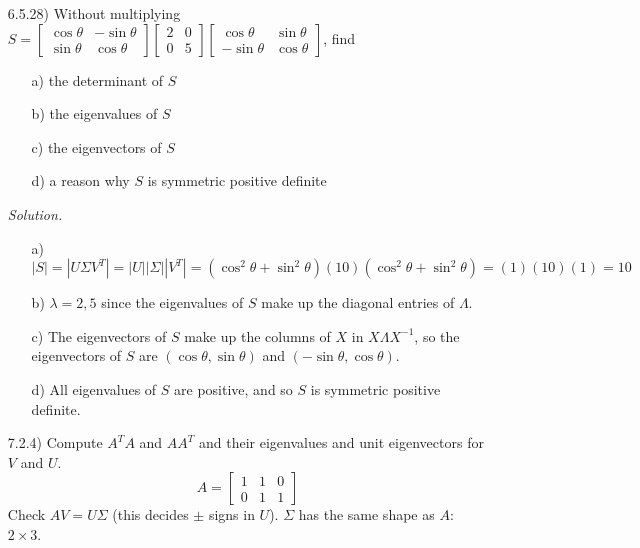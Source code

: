 \documentclass[12pt,pdftex]{article}
\begin{document}
\begin{itemize}
\item[6.5.28)] Without multiplying $S=
				\begin{bmatrix}
				\cos\theta & -\sin\theta \\ \sin\theta & \cos\theta
				\end{bmatrix}
                \begin{bmatrix}
                2 & 0 \\ 0 & 5
                \end{bmatrix}
                \begin{bmatrix}
                \cos\theta & \sin\theta \\ -\sin\theta & \cos\theta
                \end{bmatrix}$, find
                \begin{itemize}
                \item[a)] the determinant of $S$
				\item[b)] the eigenvalues of $S$
				\item[c)] the eigenvectors of $S$
                \item[d)] a reason why $S$ is symmetric positive definite
                \end{itemize}

\textit{Solution.}
\begin{itemize}
\item[a)] $|S|=|U\Sigma V^T|=|U||\Sigma||V^T|=(\cos^2\theta+\sin^2\theta)(10)(\cos^2\theta+\sin^2\theta)=(1)(10)(1)=10$
\item[b)] $\lambda=2,5$ since the eigenvalues of $S$ make up the diagonal entries of $\Lambda$.
\item[c)] The eigenvectors of $S$ make up the columns of $X$ in $X\Lambda X^{-1}$, so the eigenvectors of $S$ are
			$(\cos\theta, \sin\theta)$ and $(-\sin\theta, \cos\theta)$.
\item[d)] All eigenvalues of $S$ are positive, and so $S$ is symmetric positive definite.
\end{itemize}

\item[7.2.4)] Compute $A^TA$ and $AA^T$ and their eigenvalues and unit eigenvectors for $V$ and $U$.
\[A=\begin{bmatrix}1 & 1 & 0 \\ 0 & 1 & 1\end{bmatrix}\]
Check $AV=U\Sigma$ (this decides $\pm$ signs in $U$). $\Sigma$ has the same shape as $A$: $2 \times 3$.


\end{itemize}
\end{document}
